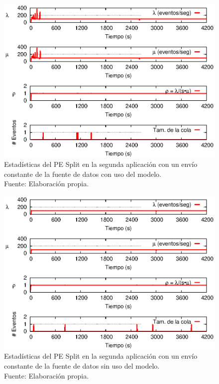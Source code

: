 \begin{figure}[!ht]
    \centering
    \captionsetup{justification=centering}
    \includegraphics[scale=1]{images/exp/app2/uniform/cm/statusSplitPE.eps}
    \caption[Estad\'isticas del PE Split en la segunda aplicaci\'on con un env\'io constante de la fuente de datos con uso del modelo.]{Estad\'isticas del PE Split en la segunda aplicaci\'on con un env\'io constante de la fuente de datos con uso del modelo.\\Fuente: Elaboraci\'on propia.}
    \label{fig:app2-uniform-statusSplitPE-cm}
\end{figure}

\begin{figure}[!ht]
    \centering
    \captionsetup{justification=centering}
    \includegraphics[scale=1]{images/exp/app2/uniform/sm/statusSplitPE.eps}
    \caption[Estad\'isticas del PE Split en la segunda aplicaci\'on con un env\'io constante de la fuente de datos sin uso del modelo.]{Estad\'isticas del PE Split en la segunda aplicaci\'on con un env\'io constante de la fuente de datos sin uso del modelo.\\Fuente: Elaboraci\'on propia.}
    \label{fig:app2-uniform-statusSplitPE-sm}
\end{figure}

